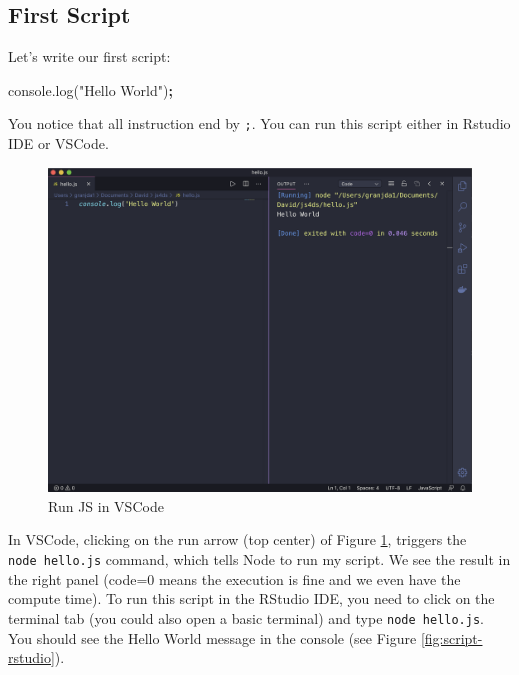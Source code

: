 \documentclass[]{book}
\newenvironment{Shaded}{\begin{snugshade}}{\end{snugshade}}
\newcommand{\AttributeTok}[1]{\textcolor[rgb]{0.77,0.63,0.00}{#1}}
\newcommand{\NormalTok}[1]{#1}
\newcommand{\OperatorTok}[1]{\textcolor[rgb]{0.81,0.36,0.00}{\textbf{#1}}}
\newcommand{\StringTok}[1]{\textcolor[rgb]{0.31,0.60,0.02}{#1}}
\newcommand{\VariableTok}[1]{\textcolor[rgb]{0.00,0.00,0.00}{#1}}
\begin{document}
\hypertarget{first-script}{%
\subsection{First Script}\label{first-script}}

Let's write our first script:

\begin{Shaded}
\begin{Highlighting}[]
\VariableTok{console}\NormalTok{.}\AttributeTok{log}\NormalTok{(}\StringTok{"Hello World"}\NormalTok{)}\OperatorTok{;}
\end{Highlighting}
\end{Shaded}

You notice that all instruction end by \texttt{;}. You can run this script either in Rstudio IDE or VSCode.

\begin{figure}
\includegraphics[width=29.61in]{images/survival-kit/script-vscode} \caption{Run JS in VSCode}\label{fig:script-vscode}
\end{figure}

In VSCode, clicking on the run arrow (top center) of Figure \ref{fig:script-vscode},
triggers the \texttt{node\ hello.js} command, which tells Node to run my script. We see the result in the right panel (code=0 means the execution is fine and we even have the compute time). To run this script in the RStudio IDE, you need to click on the terminal tab (you could also open a basic terminal) and type \texttt{node\ hello.js}. You should see the Hello World message in the console (see Figure \ref{fig:script-rstudio}).
\end{document}
